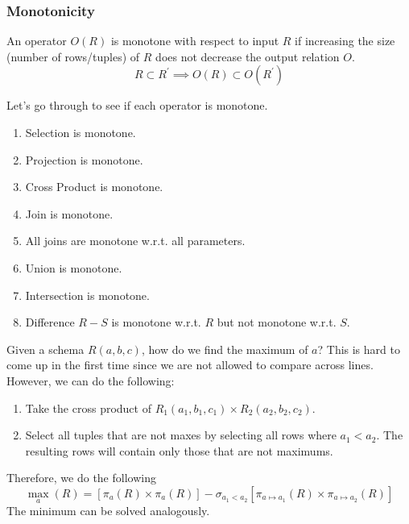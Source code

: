   \subsubsection{Monotonicity}
    
    \begin{definition}
      \label{def:monotone-operators}
      An operator $O(R)$ is monotone with respect to input $R$ if increasing the size (number of rows/tuples) of $R$ does not decrease the output relation $O$.  
      \begin{equation}
        R \subset R^\prime \implies O(R) \subset O(R^\prime)
      \end{equation}
    \end{definition}

    \begin{example}
      \label{ex:monotone-operators}
      Let's go through to see if each operator is monotone. 
      \begin{enumerate}
        \item Selection is monotone. 
        \item Projection is monotone. 
        \item Cross Product is monotone. 
        \item Join is monotone. 
        \item All joins are monotone w.r.t. all parameters. 
        \item Union is monotone. 
        \item Intersection is monotone. 
        \item Difference $R - S$ is monotone w.r.t. $R$ but not monotone w.r.t. $S$.
      \end{enumerate}
    \end{example}

    \begin{example}
      \label{ex:getting-maximum-of-an-attribute}
      Given a schema $R(a, b, c)$, how do we find the maximum of $a$? This is hard to come up in the first time since we are not allowed to compare across lines. However, we can do the following: 
      \begin{enumerate}
        \item Take the cross product of $R_1 (a_1, b_1, c_1) \times R_2 (a_2, b_2, c_2)$. 
        \item Select all tuples that are not maxes by selecting all rows where $a_1 < a_2$. The resulting rows will contain only those that are not maximums. 
      \end{enumerate}
      Therefore, we do the following 
      \begin{equation}
        \max_a (R) = [\pi_a (R) \times \pi_a (R)] - \sigma_{a_1 < a_2} [\pi_{a \mapsto a_1} (R) \times \pi_{a \mapsto a_2} (R)]
      \end{equation}
      The minimum can be solved analogously. 
    \end{example}

